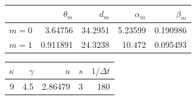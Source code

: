 \begin{tabular}{@{}lrrrr@{}}
\toprule
 & $\theta_m$ & $d_m$ & $\alpha_m$ & $\beta_m$ \\ \midrule
$m = 0$ & 3.64756 & 34.2951 & 5.23599 & 0.190986 \\
$m = 1$ & 0.911891 & 24.3238 & 10.472 & 0.095493 \\
\bottomrule
\end{tabular}
\qquad
\begin{tabular}{@{}rrrrr@{}}
\toprule
$\kappa$ & $\gamma$ & $u$ & $s$ & $1/\Delta t$ \\ \midrule
9 & 4.5 & 2.86479 & 3 & 180 \\
\bottomrule
\end{tabular}
